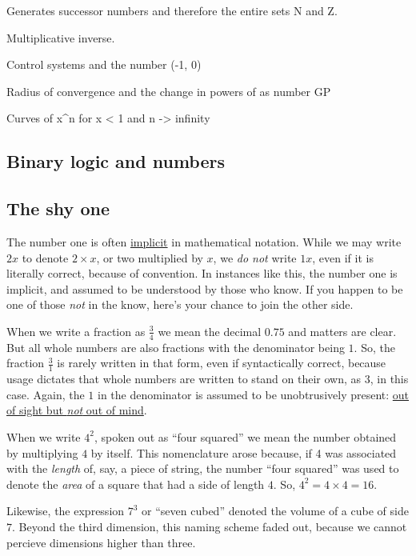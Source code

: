 \documentclass[
  a4paper,
]{article}
\begin{document}
Generates successor numbers and therefore the entire sets N and Z.

Multiplicative inverse.

Control systems and the number (-1, 0)

Radius of convergence and the change in powers of as number GP

Curves of x\^{}n for x \textless{} 1 and n -\textgreater{} infinity

\hypertarget{binary-logic-and-numbers}{%
\subsection{Binary logic and numbers}\label{binary-logic-and-numbers}}

\hypertarget{the-shy-one}{%
\subsection{The shy one}\label{the-shy-one}}

The number one is often
\href{https://www.vocabulary.com/dictionary/implicit}{implicit} in
mathematical notation. While we may write \(2x\) to denote
\(2\times x\), or two multiplied by \(x\), we \emph{do not} write
\(1x\), even if it is literally correct, because of convention. In
instances like this, the number one is implicit, and assumed to be
understood by those who know. If you happen to be one of those
\emph{not} in the know, here's your chance to join the other side.

When we write a fraction as \(\frac{3}{4}\) we mean the decimal \(0.75\)
and matters are clear. But all whole numbers are also fractions with the
denominator being \(1\). So, the fraction \(\frac{3}{1}\) is rarely
written in that form, even if syntactically correct, because usage
dictates that whole numbers are written to stand on their own, as \(3\),
in this case. Again, the \(1\) in the denominator is assumed to be
unobtrusively present:
\href{https://dictionary.cambridge.org/dictionary/english/out-of-sight-out-of-mind}{out
of sight but \emph{not} out of mind}.

When we write \(4^2\), spoken out as ``four squared'' we mean the number
obtained by multiplying \(4\) by itself. This nomenclature arose
because, if 4 was associated with the \emph{length} of, say, a piece of
string, the number ``four squared'' was used to denote the \emph{area}
of a square that had a side of length \(4\). So,
\(4^2 = 4\times4 = 16\).

Likewise, the expression \(7^3\) or ``seven cubed'' denoted the volume
of a cube of side \(7\). Beyond the third dimension, this naming scheme
faded out, because we cannot percieve dimensions higher than three.
\end{document}
